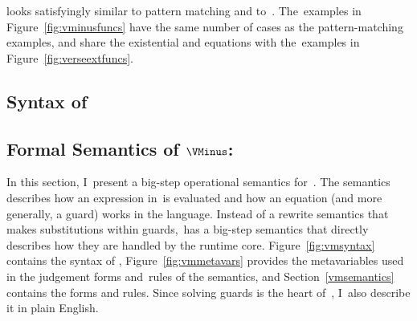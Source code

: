 \documentclass[manuscript,screen 12pt, nonacm]{acmart}
\begin{document}
    \VMinus looks satisfyingly similar to pattern matching and to~\VC.
    The~\VMinus examples in Figure~\ref{fig:vminusfuncs} have the same number of
    cases as the pattern-matching examples, and share the existential and
    equations with the~\VC examples in Figure~\ref{fig:verseextfuncs}. 
   
\subsection{Syntax of~\VMinus}





\subsection{Formal Semantics of $\VMinus$:}
    In this section, I~present a big-step operational semantics for~\VMinus. The
    semantics describes how an expression in~\VMinus is evaluated and how an
    equation (and more generally, a guard) works in the language. Instead of a
    rewrite semantics that makes substitutions within guards,~\VMinus has a
    big-step semantics that directly describes how they are handled by the
    runtime core. Figure~\ref{fig:vmsyntax} contains the syntax of \VMinus,
    Figure~\ref{fig:vmmetavars} provides the metavariables used in the judgement
    forms and~rules of the semantics, and Section~\ref{vmsemantics} contains the
    forms and rules. Since solving guards is the heart of~\VMinus, I~also
    describe it in plain English.
\end{document}
